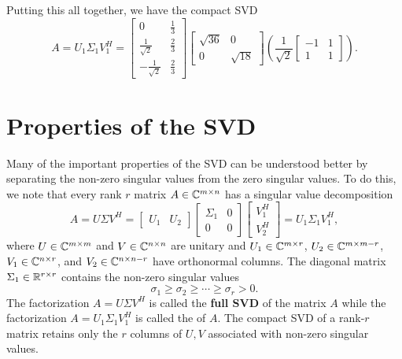 Putting this all together, we have the compact SVD
\[ A = U_1 \Sigma_1 V_1^H =
 \left[ \begin{array}{cc}
0 & \frac{1}{3} \\
\frac{1}{\sqrt{2}} & \frac{2}{3}  \\
-\frac{1}{\sqrt{2}} & \frac{2}{3} 
\end{array} \right]
\left[ \begin{array}{cc}
\sqrt{36} & 0 \\
0 & \sqrt{18}
\end{array} \right]
\left( \frac{1}{\sqrt{2}} \left[ \begin{array}{cc}
-1 & 1 \\
1 & 1 
\end{array} \right] \right). \]


\section{Properties of the SVD}

Many of the important properties of the SVD can be understood better by separating the non-zero singular values from the zero singular values.
To do this, we note that every rank $r$ matrix $A \in \mathbb{C}^{m \times n}$ has a singular value decomposition
\begin{equation*}
A = U \Sigma V^H
= \left[ \begin{array}{cc} U_1 & U_2 \end{array} \right]
\left[ \begin{array}{cc} \Sigma_1 & 0 \\ 0 & 0 \end{array} \right]
\left[ \begin{array}{c} V_1^H \\ V_2^H \end{array} \right]
= U_1 \Sigma_1 V_1^H,
\end{equation*}
where $U \in \mathbb{C}^{m \times m}$ and $V \in \mathbb{C}^{n \times n}$ are unitary and $U_1 \in \mathbb{C}^{m \times r}$, $U_2 \in \mathbb{C}^{m \times m-r}$, $V_1 \in \mathbb{C}^{n \times r}$, and $V_2 \in \mathbb{C}^{n \times n-r}$ have orthonormal columns.
The diagonal matrix $\Sigma_1 \in \mathbb{R}^{r \times r}$ contains the non-zero singular values
\[ \sigma_1 \geq \sigma_2 \geq \cdots \geq \sigma_r > 0. \]
The factorization $A = U \Sigma V^H$ is called the \textbf{full SVD} of the matrix $A$ while the factorization $A = U_1 \Sigma_1 V_1^H$ is called the  of $A$.
The compact SVD of a rank-$r$ matrix retains only the $r$ columns of $U,V$ associated with non-zero singular values.

